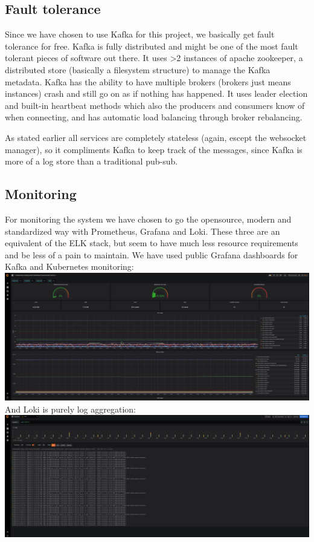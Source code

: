 \subsection{Fault tolerance}
Since we have chosen to use Kafka for this project, we basically get fault tolerance for free.
Kafka is fully distributed and might be one of the most fault tolerant pieces of software out there.
It uses >2 instances of apache zookeeper, a distributed store (basically a filesystem structure) to manage the Kafka metadata.
Kafka has the ability to have multiple brokers (brokers just means instances) crash and still go on as if nothing has happened.
It uses leader election and built-in heartbeat methods which also the producers and consumers know of when connecting, and has automatic load balancing through broker rebalancing.

As stated earlier all services are completely stateless (again, escept the websocket manager), so it compliments Kafka to keep track of the messages, since Kafka is more of a log store than a traditional pub-sub.
\subsection{Monitoring}
For monitoring the system we have chosen to go the opensource, modern and standardized way with Prometheus, Grafana and Loki.
These three are an equivalent of the ELK stack, but seem to have much less resource requirements and be less of a pain to maintain.
We have used public Grafana dashboards for Kafka and Kubernetes monitoring:\\
\includegraphics[scale=0.133]{grafana.png}\\
And Loki is purely log aggregation:\\
\includegraphics[scale=0.133]{loki.png}\\
